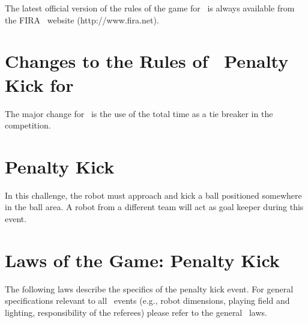 \documentclass[12pt]{hurocup}
\begin{document}
The latest official version of the rules of the game for \HuroCup\ is
always available from the FIRA \HuroCup\ website (http://www.fira.net).

\section*{Changes to the Rules of \HuroCup\ Penalty Kick for \thisyear}

The major change for \thisyear\ is the use of the total time as a tie
breaker in the competition.

\newpage

\section{Penalty Kick}
\label{sec:penalty-kick}

In this challenge, the robot must approach and kick a ball positioned
somewhere in the ball area. A robot from a different team will act as
goal keeper during this event.

\section{Laws of the Game: Penalty Kick}
\label{sec:laws-penalty-kicks}

The following laws describe the specifics of the penalty kick event. For
general specifications relevant to all \HuroCup\ events (e.g., robot
dimensions, playing field and lighting, responsibility of the
referees) please refer to the general \HuroCup\ laws.

\label{pk-field}
\end{document}
